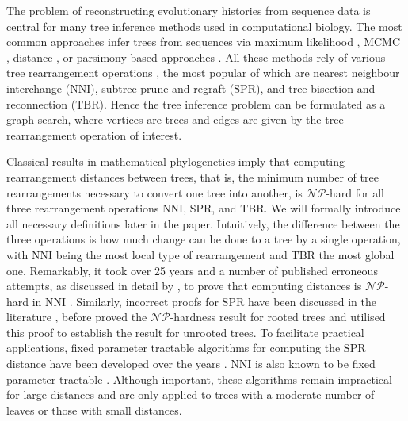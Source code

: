 \documentclass[11pt]{amsart}
\newcommand{\nni}{\mathrm{NNI}}
\newcommand{\spr}{\mathrm{SPR}}
\newcommand{\tbr}{\mathrm{TBR}}
\newcommand{\np}{\mathcal{NP}}
\newcommand{\summary}[1]{} %
\begin{document}
\summary{Motivation: many popular tree search algorithms are based on NNI (e.g. this \url{https://academic.oup.com/mbe/article/28/10/2731/973375} tool has been cited 40K+ times, see also references there to PhyML, RaxML, etc. -- they all use NNI); other applications include tree comparison methods, tree inference methods (proposal distributions), summary statistics, etc.}
The problem of reconstructing evolutionary histories from sequence data is central for many tree inference methods used in computational biology.
The most common approaches infer trees from sequences via maximum likelihood \autocite{Stamatakis2006-xb, Guindon2010-lo}, MCMC \autocite{Ronquist2003-eq, Suchard2018-tw, Bouckaert2019-yr}, distance-, or parsimony-based approaches \autocite{Tamura2011-ky}.
All these methods rely of various tree rearrangement operations \autocite{Semple2003-nj}, the most popular of which are nearest neighbour interchange ($\nni$), subtree prune and regraft ($\spr$), and tree bisection and reconnection ($\tbr$).
Hence the tree inference problem can be formulated as a graph search, where vertices are trees and edges are given by the tree rearrangement operation of interest.

\summary{Motivation: However, all known graph-based tree rearrangement distances, including NNI, are NP-hard, and it took many years and paper to prove that; so approach such as practical FPT algorithms is an active area of research to overcome the computational (cite Whidden).}
Classical results in mathematical phylogenetics imply that computing rearrangement distances between trees, that is, the minimum number of tree rearrangements necessary to convert one tree into another, is $\np$-hard \autocite{Dasgupta2000-xa, Bordewich2005-nx, Hickey2008-wv, Allen2001-ky} for all three rearrangement operations $\nni$, $\spr$, and $\tbr$.
We will formally introduce all necessary definitions later in the paper.
Intuitively, the difference between the three operations is how much change can be done to a tree by a single operation, with $\nni$ being the most local type of rearrangement and $\tbr$ the most global one.
Remarkably, it took over 25 years and a number of published erroneous attempts, as discussed in detail by \textcite{Dasgupta2000-xa}, to prove that computing distances is $\np$-hard in $\nni$ \autocite{Dasgupta2000-xa}.
Similarly, incorrect proofs for $\spr$ have been discussed in the literature \autocite{Hein1996-em, Allen2001-ky}, before \textcite{Bordewich2005-nx} proved the $\np$-hardness result for rooted trees and \textcite{Hickey2008-wv} utilised this proof to establish the result for unrooted trees.
To facilitate practical applications, fixed parameter tractable algorithms for computing the $\spr$ distance have been developed over the years \autocite{Whidden2010-bw, Bordewich2005-nx, Whidden2018-fw}.
$\nni$ is also known to be fixed parameter tractable \autocite{DasGupta1999-xf}.
Although important, these algorithms remain impractical for large distances and are only applied to trees with a moderate number of leaves or those with small distances.
\end{document}
